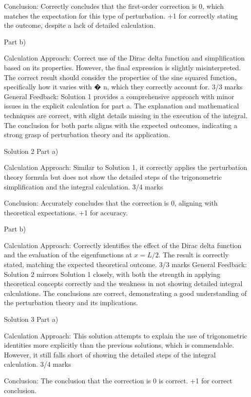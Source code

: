 \documentclass[a4paper,11pt]{article}
\begin{document}
Conclusion: Correctly concludes that the first-order correction is 0, which matches the expectation for this type of perturbation. +1 for correctly stating the outcome, despite a lack of detailed calculation.

Part b)

Calculation Approach: Correct use of the Dirac delta function and simplification based on its properties. However, the final expression is slightly misinterpreted. The correct result should consider the properties of the sine squared function, specifically how it varies with 
�
n, which they correctly account for. 3/3 marks
General Feedback: Solution 1 provides a comprehensive approach with minor issues in the explicit calculation for part a. The explanation and mathematical techniques are correct, with slight details missing in the execution of the integral. The conclusion for both parts aligns with the expected outcomes, indicating a strong grasp of perturbation theory and its application.

Solution 2
Part a)

Calculation Approach: Similar to Solution 1, it correctly applies the perturbation theory formula but does not show the detailed steps of the trigonometric simplification and the integral calculation. 3/4 marks

Conclusion: Accurately concludes that the correction is 0, aligning with theoretical expectations. +1 for accuracy.

Part b)

Calculation Approach: Correctly identifies the effect of the Dirac delta function and the evaluation of the eigenfunctions at \( x = L/2 \). The result is correctly stated, matching the expected theoretical outcome. 3/3 marks
General Feedback: Solution 2 mirrors Solution 1 closely, with both the strength in applying theoretical concepts correctly and the weakness in not showing detailed integral calculations. The conclusions are correct, demonstrating a good understanding of the perturbation theory and its implications.

Solution 3
Part a)

Calculation Approach: This solution attempts to explain the use of trigonometric identities more explicitly than the previous solutions, which is commendable. However, it still falls short of showing the detailed steps of the integral calculation. 3/4 marks

Conclusion: The conclusion that the correction is 0 is correct. +1 for correct conclusion.
\end{document}
